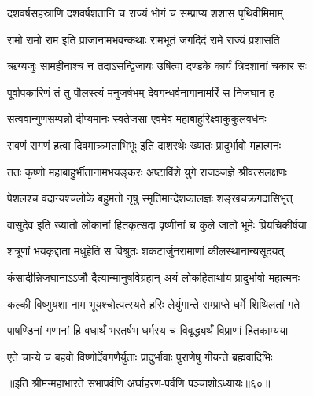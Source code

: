 \twolineshloka
{दशवर्षसहस्राणि दशवर्षशतानि च}
{राज्यं भोगं च सम्प्राप्य शशास पृथिवीमिमाम्}


\twolineshloka
{रामो रामो राम इति प्राजानामभवन्कथाः}
{रामभूतं जगदिदं रामे राज्यं प्रशासति}


\twolineshloka
{ऋग्यजुः सामहीनाश्च न तदाऽसन्द्विजायः}
{उषित्वा दण्डके कार्यं त्रिदशानां चकार सः}


\twolineshloka
{पूर्वापकारिणं तं तु पौलस्त्यं मनुजर्षभम्}
{देवगन्धर्वनागानामरिं स निजघान ह}


\twolineshloka
{सत्ववान्गुणसम्पन्नो दीप्यमानः स्वतेजसा}
{एवमेव महाबाहुरिक्ष्वाकुकुलवर्धनः}


\twolineshloka
{रावणं सगणं हत्वा दिवमाक्रमताभिभूः}
{इति दाशरथेः ख्यातः प्रादुर्भावो महात्मनः}


\twolineshloka
{ततः कृष्णो महाबाहुर्भीतानामभयङ्करः}
{अष्टाविंशे युगे राजञ्जज्ञे श्रीवत्सलक्षणः}


\twolineshloka
{पेशलश्च वदान्यश्चलोके बहुमतो नृषु}
{स्मृतिमान्देशकालज्ञः शङ्खचक्रगदासिभृत्}


\twolineshloka
{वासुदेव इति ख्यातो लोकानां हितकृत्सदा}
{वृष्णीनां च कुले जातो भूमेः प्रियचिकीर्षया}


\twolineshloka
{शत्रूणां भयकृद्दाता मधुहेति स विश्रुतः}
{शकटार्जुनरामाणां कीलस्थानान्यसूदयत्}


\twolineshloka
{कंसादीन्निजघानाऽऽजौ दैत्यान्मानुषविग्रहान्}
{अयं लोकहितार्थाय प्रादुर्भावो महात्मनः}


\twolineshloka
{कल्की विष्णुयशा नाम भूयश्चोत्पत्स्यते हरिः}
{लेर्युगान्ते सम्प्राप्ते धर्मे शिथिलतां गते}


\twolineshloka
{पाषण्डिनां गणानां हि वधार्थं भरतर्षभ}
{धर्मस्य च विवृद्ध्यर्थं विप्राणां हितकाम्यया}


\twolineshloka
{एते चान्ये च बहवो विष्णोर्देवगणैर्युताः}
{प्रादुर्भावाः पुराणेषु गीयन्ते ब्रह्मवादिभिः}


॥इति श्रीमन्महाभारते सभापर्वणि अर्घाहरण-पर्वणि पञ्चाशोऽध्यायः॥६०॥

\closesection